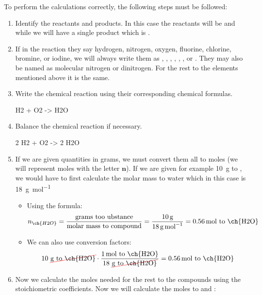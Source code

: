 To perform the calculations correctly, the following steps must be followed:
\begin{enumerate}[label=\numberballmDarkTeal]
        \item Identify the reactants and products.
        In this case the reactants will be  and  while we will have a single product which is .
        \item If in the reaction they say hydrogen, nitrogen, oxygen, fluorine, chlorine, bromine, or iodine, we will always write them as , , , , , , or .
        They may also be named as molecular nitrogen or dinitrogen.
        For the rest to the elements mentioned above it is the same.
        \item Write the chemical reaction using their corresponding chemical formulas.
        \begin{reaction*}
            H2 + O2 -> H2O
        \end{reaction*}
        \item Balance the chemical reaction if necessary.
        \begin{reaction*}
            2 H2 + O2 -> 2 H2O
        \end{reaction*}
        \item If we are given quantities in grams, we must convert them all to moles (we will represent moles with the letter \( \bm{n} \)).
        If we are given for example \qty{10}{\g} to , we would have to first calculate the molar mass to water which in this case is \qty{18}{\g\per\mol}
        \begin{itemize}
            \item Using the formula:
            \begin{equation*}
                n_{\ch{H2O}} = \dfrac{\text{grams too ubstance}}{\text{molar mass to compound}} = \dfrac{\qty{10}{\g}}{\qty{18}{\g\per\mol}} = \qty{0.56}{\mol}\ \text{to \ch{H2O}}
            \end{equation*}
            \item We can also use conversion factors:
            \begin{equation*}
                10\ \cancelred{\unit{\g}\ \text{to \ch{H2O}}} \cdot \dfrac{\qty{1}{\mol}\ \text{to \ch{H2O}}}{18\ \cancelred{\unit{\g} \ \text{to \ch{H2O}}}} = \qty{0.56}{\mol}\ \text{to \ch{H2O}}
            \end{equation*}
        \end{itemize}
        \item Now we calculate the moles needed for the rest to the compounds using the stoichiometric coefficients.
        Now we will calculate the moles to  and :


\end{enumerate}
